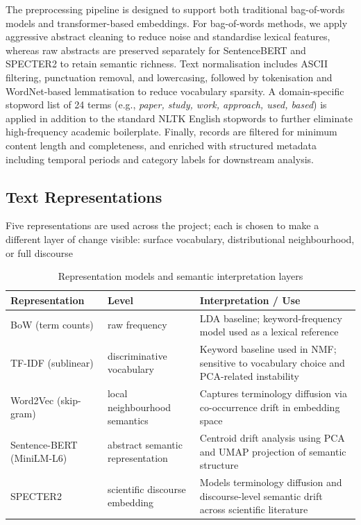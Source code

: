 The preprocessing pipeline is designed to support both traditional bag-of-words models and transformer-based embeddings. For bag-of-words methods, we apply aggressive abstract cleaning to reduce noise and standardise lexical features, whereas raw abstracts are preserved separately for SentenceBERT and SPECTER2 \cite{specter2} to retain semantic richness. Text normalisation includes ASCII filtering, punctuation removal, and lowercasing, followed by tokenisation and WordNet-based lemmatisation to reduce vocabulary sparsity. A domain-specific stopword list of 24 terms (e.g., \textit{paper, study, work, approach, used, based}) is applied in addition to the standard NLTK English stopwords to further eliminate high-frequency academic boilerplate. Finally, records are filtered for minimum content length and completeness, and enriched with structured metadata including temporal periods and category labels for downstream analysis.

\subsection{Text Representations}
Five representations are used across the project; each is chosen to make a different layer of change visible: surface vocabulary, distributional neighbourhood, or full discourse

\begin{table}[H]
\centering
\caption{Representation models and semantic interpretation layers}
\small
\setlength{\tabcolsep}{3pt}

\begin{tabularx}{\columnwidth}{p{2.2cm} p{2.2cm} X}
\toprule
\textbf{Representation} & \textbf{Level} & \textbf{Interpretation / Use} \\
\midrule

BoW (term counts) 
& raw frequency 
& LDA baseline; keyword-frequency model used as a lexical reference \\
\addlinespace

TF-IDF (sublinear) 
& discriminative vocabulary 
& Keyword baseline used in NMF; sensitive to vocabulary choice and PCA-related instability \\
\addlinespace

Word2Vec (skip-gram) 
& local neighbourhood semantics 
& Captures terminology diffusion via co-occurrence drift in embedding space \\
\addlinespace

Sentence-BERT (MiniLM-L6) 
& abstract semantic representation 
& Centroid drift analysis using PCA and UMAP projection of semantic structure \\
\addlinespace

SPECTER2 
& scientific discourse embedding 
& Models terminology diffusion and discourse-level semantic drift across scientific literature \\
\bottomrule
\end{tabularx}
\end{table}

